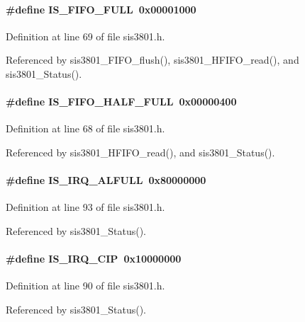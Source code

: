 \paragraph[{IS\_\-FIFO\_\-FULL}]{\setlength{\rightskip}{0pt plus 5cm}\#define IS\_\-FIFO\_\-FULL~0x00001000}\hfill\label{sis3801_8h_a22e5e17891861e5730982889e52c6213}


Definition at line 69 of file sis3801.h.

Referenced by sis3801\_\-FIFO\_\-flush(), sis3801\_\-HFIFO\_\-read(), and sis3801\_\-Status().
\paragraph[{IS\_\-FIFO\_\-HALF\_\-FULL}]{\setlength{\rightskip}{0pt plus 5cm}\#define IS\_\-FIFO\_\-HALF\_\-FULL~0x00000400}\hfill\label{sis3801_8h_a2c9fe1f048b14193aea51c30467ba37e}


Definition at line 68 of file sis3801.h.

Referenced by sis3801\_\-HFIFO\_\-read(), and sis3801\_\-Status().
\paragraph[{IS\_\-IRQ\_\-ALFULL}]{\setlength{\rightskip}{0pt plus 5cm}\#define IS\_\-IRQ\_\-ALFULL~0x80000000}\hfill\label{sis3801_8h_a010e34de1ec89fe23d00fc927f68b6eb}


Definition at line 93 of file sis3801.h.

Referenced by sis3801\_\-Status().
\paragraph[{IS\_\-IRQ\_\-CIP}]{\setlength{\rightskip}{0pt plus 5cm}\#define IS\_\-IRQ\_\-CIP~0x10000000}\hfill\label{sis3801_8h_a91936e1310c64751150ca346e63f8e17}


Definition at line 90 of file sis3801.h.

Referenced by sis3801\_\-Status().
